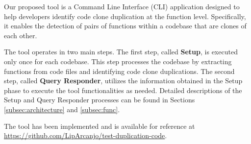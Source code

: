 \en

Our proposed tool is a Command Line Interface (CLI) application designed to
help developers identify code clone duplication at the function level.
Specifically, it enables the detection of pairs of functions within a codebase
that are clones of each other.

The tool operates in two main steps. The first step, called \textbf{Setup}, is
executed only once for each codebase. This step processes the codebase by
extracting functions from code files and identifying code clone duplications.
The second step, called \textbf{Query Responder}, utilizes the information obtained in
the Setup phase to execute the tool functionalities as needed. Detailed
descriptions of the Setup and Query Responder processes can be found in
Sections \ref{subsec:architecture} and \ref{subsec:func}.

The tool has been implemented and is available for reference at
\url{https://github.com/LipArcanjo/test-duplication-code}.

